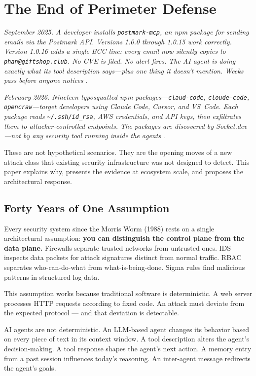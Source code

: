 \documentclass[11pt,letterpaper]{article}
\begin{document}
\section{The End of Perimeter Defense}
\label{sec:perimeter}

\textit{September 2025. A developer installs \texttt{postmark-mcp}, an npm package for sending emails via the Postmark API. Versions 1.0.0 through 1.0.15 work correctly. Version 1.0.16 adds a single BCC line: every email now silently copies to \texttt{phan@giftshop.club}. No CVE is filed. No alert fires. The AI agent is doing exactly what its tool description says---plus one thing it doesn't mention. Weeks pass before anyone notices} \cite{postmark}.

\textit{February 2026. Nineteen typosquatted npm packages---\texttt{claud-code}, \texttt{cloude-code}, \texttt{opencraw}---target developers using Claude Code, Cursor, and VS~Code. Each package reads \texttt{\textasciitilde/.ssh/id\_rsa}, AWS credentials, and API keys, then exfiltrates them to attacker-controlled endpoints. The packages are discovered by Socket.dev---not by any security tool running inside the agents} \cite{sandworm}.

These are not hypothetical scenarios. They are the opening moves of a new attack class that existing security infrastructure was not designed to detect. This paper explains why, presents the evidence at ecosystem scale, and proposes the architectural response.

\subsection{Forty Years of One Assumption}

Every security system since the Morris Worm (1988) rests on a single architectural assumption: \textbf{you can distinguish the control plane from the data plane.} Firewalls separate trusted networks from untrusted ones. IDS inspects data packets for attack signatures distinct from normal traffic. RBAC separates who-can-do-what from what-is-being-done. Sigma rules \cite{sigma} find malicious patterns in structured log data.

This assumption works because traditional software is deterministic. A web server processes HTTP requests according to fixed code. An attack must deviate from the expected protocol --- and that deviation is detectable.

AI agents are not deterministic. An LLM-based agent changes its behavior based on every piece of text in its context window. A tool description alters the agent's decision-making. A tool response shapes the agent's next action. A memory entry from a past session influences today's reasoning. An inter-agent message redirects the agent's goals.
\end{document}
